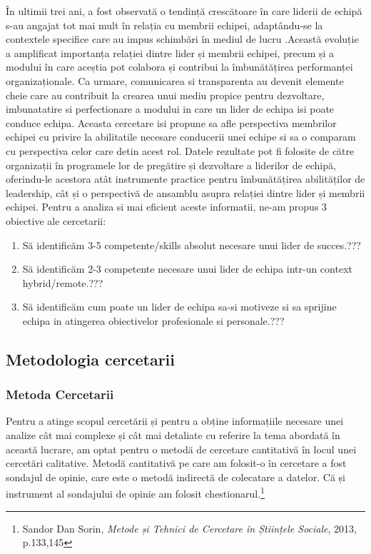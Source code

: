 \documentclass[a4paper, 12pt]{article}
\begin{document}
	\quad În ultimii trei ani, a fost observată o tendință crescătoare în care liderii de echipă s-au angajat tot mai mult în relația cu membrii echipei, adaptându-se la contextele specifice care au impus schimbări în mediul de lucru .Această evoluție a amplificat importanța relației dintre lider și membrii echipei, precum și a modului în care aceștia pot colabora și contribui la îmbunătățirea performanței organizaționale. Ca urmare, comunicarea si transparenta au devenit elemente cheie care au contribuit la crearea unui mediu propice pentru dezvoltare, imbunatatire si perfectionare a modului in care un lider de echipa isi poate conduce echipa. Aceasta cercetare isi propune sa afle perspectiva membrilor echipei cu privire la abilitatile necesare conducerii unei echipe si sa o comparam cu perspectiva celor care detin acest rol. Datele rezultate  pot fi folosite de către organizații în programele lor de pregătire și dezvoltare a liderilor de echipă, oferindu-le acestora atât instrumente practice pentru îmbunătățirea abilităților de leadership, cât și o perspectivă de ansamblu asupra relației dintre lider și membrii echipei. Pentru a analiza si mai eficient aceste informatii, ne-am propus 3 obiective ale cercetarii: 
	\begin{enumerate}[(1)]
		\item Să identificăm 3-5 competente/skills absolut necesare unui lider de succes.???
		\item Să identificăm 2-3 competente necesare unui lider de echipa intr-un context hybrid/remote.???
		\item Să identificăm cum poate un lider de echipa sa-si motiveze si sa sprijine echipa in atingerea obiectivelor profesionale si personale.???
	\end{enumerate}


	\subsection{Metodologia cercetarii}

		\subsubsection{Metoda Cercetarii}
	\qquad\space Pentru a atinge scopul cercetării și pentru a obține informațiile necesare unei analize cât mai complexe și cât mai detaliate cu referire la tema abordată în această lucrare, am optat pentru o metodă de cercetare cantitativă în locul unei cercetări calitative.
	\quad Metodă cantitativă pe care am folosit-o în cercetare a fost sondajul de opinie, care este o metodă indirectă de colecatare a datelor. Că și instrument al sondajului de opinie am folosit chestionarul.\footnote{Sandor Dan Sorin, \textit{Metode și Tehnici de Cercetare în Științele Sociale}, 2013, p.133,145}
\end{document}
